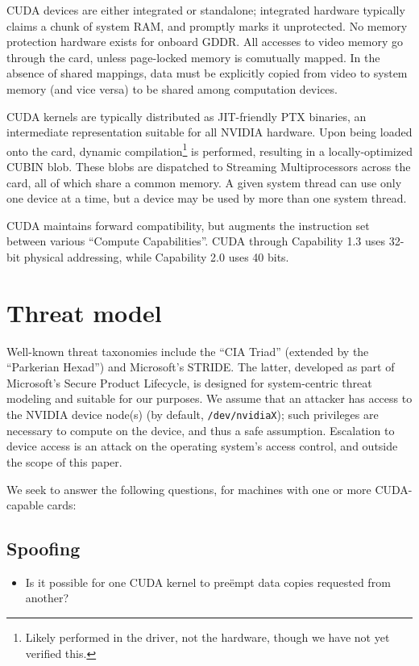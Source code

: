 \documentclass[letterpaper,10pt]{article}
\begin{document}
\begin{multicols}{2}
CUDA devices are either integrated or standalone; integrated hardware typically
claims a chunk of system RAM, and promptly marks it unprotected. No memory
protection hardware exists for onboard GDDR. All accesses to video memory go
through the card, unless page-locked memory is comutually mapped. In the
absence of shared mappings, data must be explicitly copied from video to system
memory (and vice versa) to be shared among computation devices\cite{cudaguide}.

CUDA kernels are typically distributed as JIT-friendly PTX binaries\cite{kerr},
an intermediate representation suitable for all NVIDIA hardware. Upon being
loaded onto the card, dynamic compilation\footnote{Likely performed in the
driver, not the hardware, though we have not yet verified this.} is performed,
resulting in a locally-optimized CUBIN blob. These blobs are dispatched to
Streaming Multiprocessors across the card, all of which share a common memory.
A given system thread can use only one device at a time, but a device may be
used by more than one system thread.

CUDA maintains forward compatibility, but augments the instruction set
between various ``Compute Capabilities''.  CUDA through Capability 1.3 uses
32-bit physical addressing, while Capability 2.0 uses 40 bits.

\section{Threat model}
Well-known threat taxonomies include the ``CIA Triad'' (extended by the
``Parkerian Hexad\cite{sechandbook}'') and Microsoft's STRIDE. The latter, developed as part of
Microsoft's Secure Product Lifecycle, is designed for system-centric threat
modeling and suitable for our purposes. We assume that an attacker has access
to the NVIDIA device node(s) (by default, \texttt{/dev/nvidiaX}); such privileges
are necessary to compute on the device, and thus a safe assumption. Escalation
to device access is an attack on the operating system's access control, and
outside the scope of this paper.

We seek to answer the following questions, for machines with one or more CUDA-capable
cards:
\subsection{Spoofing}
\begin{itemize}
\item Is it possible for one CUDA kernel to pre\"empt data copies requested
from another?
\end{itemize}

\end{multicols}
\end{document}
